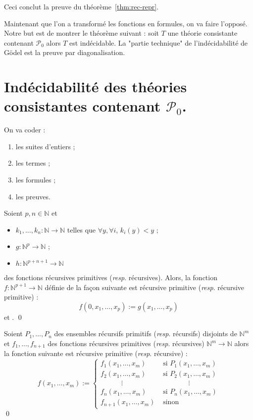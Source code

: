 \documentclass[./main]{subfiles}
\begin{document}
 Ceci conclut la preuve du théorème~\ref{thm:rec-repr}.

 Maintenant que l'on a transformé les fonctions en formules, on va faire l'opposé.
 Notre but est de montrer le théorème suivant :
 soit $T$ une théorie consistante contenant $\mathcal{P}_0$ alors $T$ est indécidable.
 La "partie technique" de l'indécidabilité de Gödel est la preuve par diagonalisation.

 \section{Indécidabilité des théories consistantes contenant $\mathcal{P}_0$.}

 On va coder :
 \begin{enumerate}
   \item les suites d'entiers ;
   \item les termes ;
   \item les formules ;
   \item les preuves.
 \end{enumerate}

 \begin{lem}[Récursion]
   Soient $p, n \in \mathds{N}$ et 
   \begin{itemize}
     \item $k_1, \ldots, k_n : \mathds{N} \to \mathds{N}$ telles que $\forall y, \forall i$, $k_i(y) < y$ ;
     \item  $g : \mathds{N}^p \to \mathds{N}$ ;
     \item $h : \mathds{N}^{p + n+1} \to \mathds{N}$
   \end{itemize}
   des fonctions récursives primitives (\textit{resp}. récursives).
   Alors, la fonction $f : \mathds{N}^{p+1} \to \mathds{N}$ définie de la façon suivante est récursive primitive (\textit{resp}. récursive primitive) :
   \[f(0, x_1, \ldots, x_p) := g(x_1, \ldots, x_p)\]
   et
   .
   \qed
 \end{lem}

 \begin{lem}
   Soient $P_1, \ldots, P_n$ des ensembles récursifs primitifs (\textit{resp}. récursifs) disjoints de $\mathds{N}^m$ et $f_1, \ldots, f_{n+1}$ des fonctions récursives primitives (\textit{resp}. récursives) $\mathds{N}^m \to \mathds{N}$ alors la fonction suivante est récursive primitive (\textit{resp}. récursive) :
   \[
   f(x_1, \ldots, x_m) := \begin{cases}
     f_1(x_1, \ldots, x_m) & \text{ si } P_1(x_1, \ldots, x_m)\\
     f_2(x_1, \ldots, x_m) & \text{ si } P_2(x_1, \ldots, x_m)\\
     \quad\quad\quad\vdots \quad & \quad\quad\quad\quad \vdots\\
     f_n(x_1, \ldots, x_m) & \text{ si } P_n(x_1, \ldots, x_m)\\
     f_{n+1}(x_1, \ldots, x_m) & \text{ sinon}
   \end{cases}
   \] \qed
 \end{lem}
\end{document}
